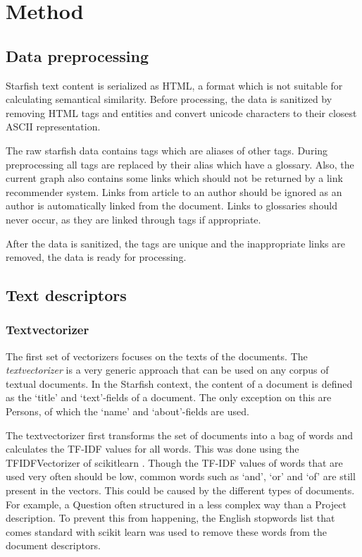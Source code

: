 \section{Method}
\subsection{Data preprocessing}
Starfish text content is serialized as HTML, a format which is not suitable for
calculating semantical similarity. Before processing, the data is sanitized by
removing HTML tags and entities and convert unicode characters to their closest
ASCII representation.

The raw starfish data contains tags which are aliases of other tags. During 
preprocessing all tags are replaced by their alias which have a glossary. Also, 
the current graph also contains some links which should not be returned by a 
link recommender system. Links from article to an author should be ignored as 
an author is automatically linked from the document. Links to glossaries should 
never occur, as they are linked through tags if appropriate.

After the data is sanitized, the tags are unique and the inappropriate links are 
removed, the data is ready for processing.

\subsection{Text descriptors}
\subsubsection{Textvectorizer}

The first set of vectorizers focuses on the texts of the documents. The
\emph{textvectorizer} is a very generic approach that can be used on any corpus
of textual documents. In the Starfish context, the content of a document is defined as the `title'
and `text'-fields of a document. The only exception on this are Persons, of which
the `name' and `about'-fields are used. 

The textvectorizer first transforms the set of documents into a bag of words
and calculates the TF-IDF values for all words. This was done using the
TFIDFVectorizer of scikitlearn \citep{scikit-learn}.  Though the TF-IDF values
of words that are used very often should be low, common words such as `and',
`or' and `of' are still present in the vectors. This could be caused by the
different types of documents. For example, a Question often structured in a
less complex way than a Project description. To prevent this from happening,
the English stopwords list that comes standard with scikit learn was used to
remove these words from the document descriptors.

